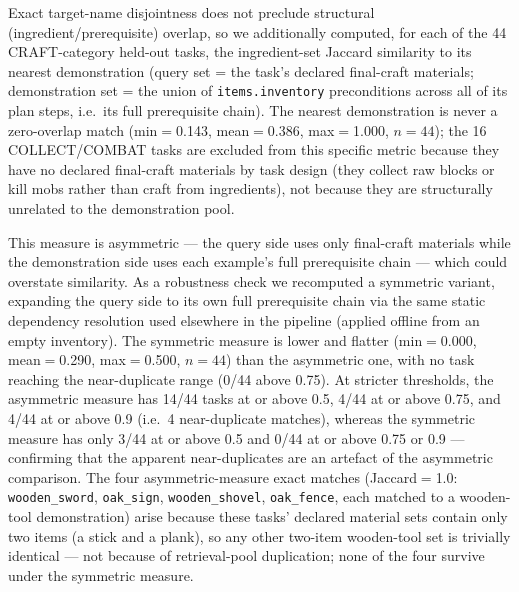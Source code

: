 \documentclass[letterpaper]{article} %
\begin{document}
Exact target-name disjointness does not preclude structural
(ingredient/prerequisite) overlap, so we additionally computed, for
each of the 44 CRAFT-category held-out tasks, the ingredient-set
Jaccard similarity to its nearest demonstration (query set = the
task's declared final-craft materials; demonstration set = the union
of \texttt{items.inventory} preconditions across all of its plan
steps, i.e.\ its full prerequisite chain).  The nearest demonstration
is never a zero-overlap match (min$=$0.143, mean$=$0.386,
max$=$1.000, $n{=}44$); the 16 COLLECT/COMBAT tasks are excluded from
this specific metric because they have no declared final-craft
materials by task design (they collect raw blocks or kill mobs rather
than craft from ingredients), not because they are structurally
unrelated to the demonstration pool.

This measure is asymmetric --- the query side uses only final-craft
materials while the demonstration side uses each example's full
prerequisite chain --- which could overstate similarity. As a
robustness check we recomputed a symmetric variant, expanding the
query side to its own full prerequisite chain via the same static
dependency resolution used elsewhere in the pipeline (applied offline
from an empty inventory). The symmetric measure is lower and flatter
(min$=$0.000, mean$=$0.290, max$=$0.500, $n{=}44$) than the
asymmetric one, with no task reaching the near-duplicate range (0/44
above 0.75). At stricter thresholds, the asymmetric measure has 14/44
tasks at or above 0.5, 4/44 at or above 0.75, and 4/44 at or above 0.9
(i.e.\ 4 near-duplicate matches), whereas the symmetric measure has
only 3/44 at or above 0.5 and 0/44 at or above 0.75 or 0.9 --- confirming
that the apparent near-duplicates are an artefact of the asymmetric
comparison. The four asymmetric-measure exact matches (Jaccard$=$1.0:
\texttt{wooden\_sword}, \texttt{oak\_sign}, \texttt{wooden\_shovel},
\texttt{oak\_fence}, each matched to a wooden-tool demonstration)
arise because these tasks' declared material sets contain only two
items (a stick and a plank), so any other two-item wooden-tool set is
trivially identical --- not because of retrieval-pool duplication; none
of the four survive under the symmetric measure.
\end{document}
